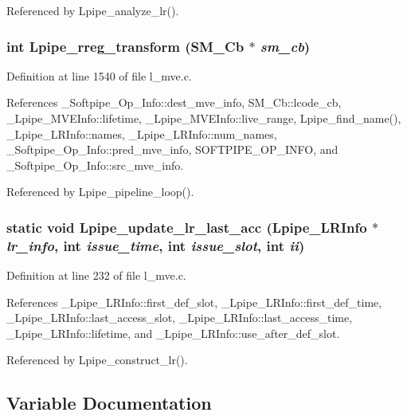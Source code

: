 Referenced by Lpipe\_\-analyze\_\-lr().
\subsubsection{\setlength{\rightskip}{0pt plus 5cm}int Lpipe\_\-rreg\_\-transform (\bf{SM\_\-Cb} $\ast$ {\em sm\_\-cb})}\label{l__mve_8c_6d37a198558a19c6fc216dc807812c85}




Definition at line 1540 of file l\_\-mve.c.

References \_\-Softpipe\_\-Op\_\-Info::dest\_\-mve\_\-info, SM\_\-Cb::lcode\_\-cb, \_\-Lpipe\_\-MVEInfo::lifetime, \_\-Lpipe\_\-MVEInfo::live\_\-range, Lpipe\_\-find\_\-name(), \_\-Lpipe\_\-LRInfo::names, \_\-Lpipe\_\-LRInfo::num\_\-names, \_\-Softpipe\_\-Op\_\-Info::pred\_\-mve\_\-info, SOFTPIPE\_\-OP\_\-INFO, and \_\-Softpipe\_\-Op\_\-Info::src\_\-mve\_\-info.

Referenced by Lpipe\_\-pipeline\_\-loop().
\subsubsection{\setlength{\rightskip}{0pt plus 5cm}static void Lpipe\_\-update\_\-lr\_\-last\_\-acc (\bf{Lpipe\_\-LRInfo} $\ast$ {\em lr\_\-info}, int {\em issue\_\-time}, int {\em issue\_\-slot}, int {\em ii})\hspace{0.3cm}{\tt  [static]}}\label{l__mve_8c_1d39b58ce865b3522fddcb21b1195f28}




Definition at line 232 of file l\_\-mve.c.

References \_\-Lpipe\_\-LRInfo::first\_\-def\_\-slot, \_\-Lpipe\_\-LRInfo::first\_\-def\_\-time, \_\-Lpipe\_\-LRInfo::last\_\-access\_\-slot, \_\-Lpipe\_\-LRInfo::last\_\-access\_\-time, \_\-Lpipe\_\-LRInfo::lifetime, and \_\-Lpipe\_\-LRInfo::use\_\-after\_\-def\_\-slot.

Referenced by Lpipe\_\-construct\_\-lr().

\subsection{Variable Documentation}
